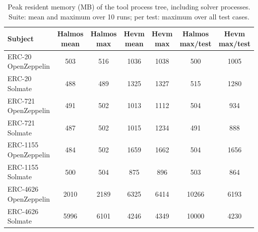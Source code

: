 \begin{table}[htb]
\centering
\begin{scriptsize}
\begin{tabular}{lcccccc}
\toprule
\textbf{Subject} & \textbf{Halmos mean} & \textbf{Halmos max} & \textbf{Hevm mean} & \textbf{Hevm max} & \textbf{Halmos max/test} & \textbf{Hevm max/test} \\
\midrule
ERC-20 OpenZeppelin & 503 & 516 & 1036 & 1038 & 500 & 1005 \\
ERC-20 Solmate & 488 & 489 & 1325 & 1327 & 515 & 1280 \\
ERC-721 OpenZeppelin & 491 & 502 & 1013 & 1112 & 504 & 934 \\
ERC-721 Solmate & 487 & 502 & 1015 & 1234 & 491 & 888 \\
ERC-1155 OpenZeppelin & 484 & 502 & 1659 & 1662 & 504 & 1656 \\
ERC-1155 Solmate & 500 & 504 & 875 & 896 & 503 & 864 \\
ERC-4626 OpenZeppelin & 2010 & 2189 & 6325 & 6414 & 10266 & 6193 \\
ERC-4626 Solmate & 5996 & 6101 & 4246 & 4349 & 10000 & 4230 \\
\bottomrule
\end{tabular}
\end{scriptsize}
\caption{Peak resident memory (MB) of the tool process tree, including solver processes. Suite: mean and maximum over 10 runs; per test: maximum over all test cases.}
\label{tab:memory}
\end{table}
